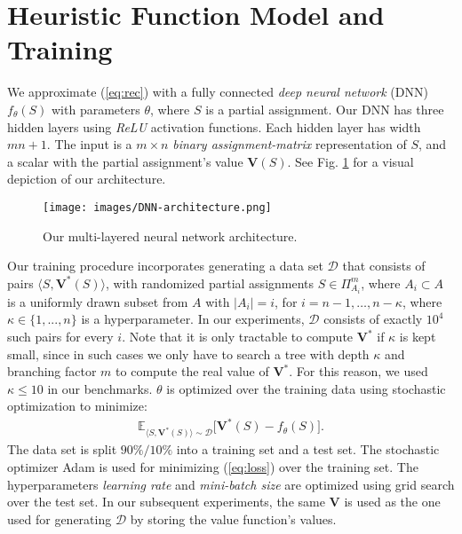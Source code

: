 \documentclass[runningheads]{llncs}
\newcounter{ctTODO}
\newcommand{\TODO}[1]{%
	\textcolor{red}{\textbf{TODO(\arabic{ctTODO}): } #1}%
	\addtocounter{ctTODO}{1}%
}
\begin{document}
	
	
	
	
	
	\section{Heuristic Function Model and Training}
	
	We approximate (\ref{eq:rec}) with a fully connected \textit{deep neural network} (DNN) $f_\theta({S})$ with parameters $\theta$, where ${S}$ is a partial assignment. Our DNN has three hidden layers using \emph{ReLU} \cite{lecun2015deep} activation functions. Each hidden layer has width $mn + 1$. The input is a $m\times n$ \emph{binary assignment-matrix} representation of ${S}$, and a scalar with the partial assignment's value $\bm{V}({S})$. See Fig. \ref{fig:NN-architecture} for a visual depiction of our architecture.

	\begin{figure}[h]
		\centering
		\texttt{[image: images/DNN-architecture.png]}
		\caption{Our multi-layered neural network architecture.}
		\label{fig:NN-architecture}
	\end{figure}
	Our training procedure incorporates generating a data set $\mathcal{D}$ that consists of pairs $\langle {S}, \bm{V}^*({S}) \rangle$, with randomized partial assignments ${S} \in \Pi_{A_i}^m$, where $A_i\subset A$ is a uniformly drawn subset from $A$ with $|A_i|=i$, for $i = n-1,\dots,n-\kappa$, where $\kappa \in \{1,...,n\}$ is a hyperparameter. In our experiments, $\mathcal{D}$ consists of exactly $10^4$ such pairs for every $i$. Note that it is only tractable to compute $\bm{V}^*$ if $\kappa$ is kept small, since in such cases we only have to search a tree with depth $\kappa$ and branching factor $m$ to compute the real value of $\bm{V}^*$. For this reason, we used $\kappa \leq 10$ in our benchmarks. $\theta$ is optimized over the training data using stochastic optimization to minimize:
	\begin{align}
	\mathbb{E}_{\langle {S}, \bm{V}^*({S}) \rangle\sim\mathcal{D}}\big[\bm{V}^*({S}) - f_\theta({S})\big].
	\label{eq:loss}
	\end{align}
	The data set is split $90\%/10\%$ into a training set and a test set. The stochastic optimizer Adam \cite{kingma2014adam} is used for minimizing (\ref{eq:loss}) over the training set. The hyperparameters \textit{learning rate} and \textit{mini-batch size} are optimized using grid search over the test set.  In our subsequent experiments, the same $\bm{V}$ is used as the one used for generating $\mathcal{D}$ by storing the value function's values.  
 
\end{document}
